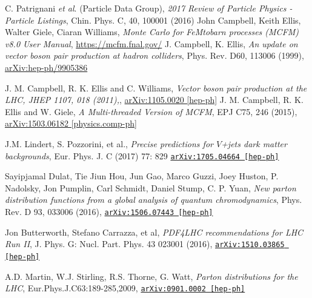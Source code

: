 \documentclass[11pt,a4paper,openright,twoside]{report}
\newcommand{\bibref}[4]{#1, \textit{#2}, #3 #4}
\begin{document}
\begin{thebibliography}{9}

	\bibref{C. Patrignani \textit{et al}. (Particle Data Group)}{2017 Review of Particle Physics - Particle Listings}{Chin. Phys. C, 40, 100001 (2016)}

	\bibref{John Campbell, Keith Ellis, Walter Giele, Ciaran Williams}{Monte Carlo for FeMtobarn processes (MCFM) v8.0 User Manual}{\url{https://mcfm.fnal.gov/}}
	
	\bibref{J. Campbell, K. Ellis}{An update on vector boson pair production at hadron colliders}{Phys. Rev. D60, 113006 (1999),}{\href{https://arxiv.org/abs/hep-ph/9905386}{arXiv:hep-ph/9905386}}

	\bibref{J. M. Campbell, R. K. Ellis and C. Williams}{Vector boson pair production at the LHC, JHEP 1107, 018 (2011),}{\href{https://arxiv.org/abs/1105.0020}{arXiv:1105.0020 [hep-ph]}}

	\bibref{J. M. Campbell, R. K. Ellis and W. Giele}{A Multi-threaded Version of MCFM}{EPJ C75, 246 (2015),}{\href{https://arxiv.org/abs/1503.06182}{arXiv:1503.06182 [physics.comp-ph]}}

	\bibref{J.M. Lindert, S. Pozzorini, et al.}{Precise predictions for $V$+jets dark matter backgrounds}{Eur. Phys. J. C (2017) 77: 829}{\href{https://arxiv.org/abs/1705.04664}{\texttt{arXiv:1705.04664 [hep-ph]}}}
	
	\bibref{Sayipjamal Dulat, Tie Jiun Hou, Jun Gao, Marco Guzzi, Joey Huston, P. Nadolsky, Jon Pumplin, Carl Schmidt, Daniel Stump, C. P. Yuan}{New parton distribution functions from a global analysis of quantum chromodynamics}{Phys. Rev. D 93, 033006 (2016),}{\href{https://arxiv.org/abs/1506.07443}{\texttt{arXiv:1506.07443 [hep-ph]}}}

	\bibref{Jon Butterworth, Stefano Carrazza, et al}{PDF4LHC recommendations for LHC Run II}{J. Phys. G: Nucl. Part. Phys. 43 023001 (2016),}{\href{https://arxiv.org/abs/1510.03865}{\texttt{arXiv:1510.03865 [hep-ph]}}}

	\bibref{A.D. Martin, W.J. Stirling, R.S. Thorne, G. Watt}{Parton distributions for the LHC}{Eur.Phys.J.C63:189-285,2009,}{\href{https://arxiv.org/abs/0901.0002}{\texttt{arXiv:0901.0002 [hep-ph]}}}
	

\end{thebibliography}
\end{document}
